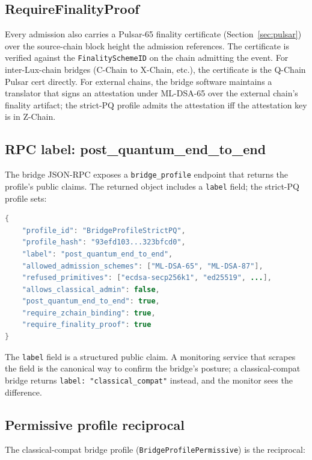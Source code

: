\subsection{RequireFinalityProof}

Every admission also carries a Pulsar-65 finality certificate
(Section~\ref{sec:pulsar}) over the source-chain block height the
admission references. The certificate is verified against the
\texttt{FinalitySchemeID} on the chain admitting the event. For
inter-Lux-chain bridges (C-Chain to X-Chain, etc.), the certificate is the
Q-Chain Pulsar cert directly. For external chains, the bridge software
maintains a translator that signs an attestation under ML-DSA-65 over the
external chain's finality artifact; the strict-PQ profile admits the
attestation iff the attestation key is in Z-Chain.

\subsection{RPC label: post\_quantum\_end\_to\_end}

The bridge JSON-RPC exposes a \texttt{bridge\_profile} endpoint that
returns the profile's public claims. The returned object includes a
\texttt{label} field; the strict-PQ profile sets:

\begin{lstlisting}[language=Java,caption={Bridge profile RPC response.}]
{
    "profile_id": "BridgeProfileStrictPQ",
    "profile_hash": "93efd103...323bfcd0",
    "label": "post_quantum_end_to_end",
    "allowed_admission_schemes": ["ML-DSA-65", "ML-DSA-87"],
    "refused_primitives": ["ecdsa-secp256k1", "ed25519", ...],
    "allows_classical_admin": false,
    "post_quantum_end_to_end": true,
    "require_zchain_binding": true,
    "require_finality_proof": true
}
\end{lstlisting}

The \texttt{label} field is a structured public claim. A monitoring service
that scrapes the field is the canonical way to confirm the bridge's
posture; a classical-compat bridge returns
\texttt{label: "classical\_compat"} instead, and the monitor sees the
difference.

\subsection{Permissive profile reciprocal}

The classical-compat bridge profile (\texttt{BridgeProfilePermissive}) is
the reciprocal:

